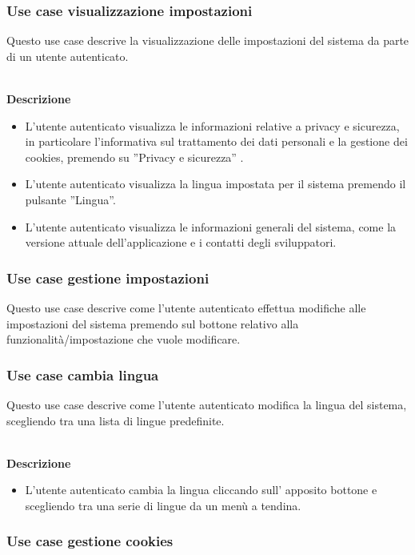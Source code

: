 \documentclass[a4paper,12pt]{article}
\begin{document}
\subsubsection*{Use case visualizzazione impostazioni}

Questo use case descrive la visualizzazione delle impostazioni del sistema da parte di un utente autenticato.

\textbf{\\Descrizione}
\begin{itemize} \setlength\itemsep{0.01em}
\item L'utente autenticato visualizza le informazioni relative a privacy e sicurezza, in particolare l'informativa sul trattamento dei dati personali e la gestione dei cookies, premendo su ''Privacy e sicurezza'' .
\item L'utente autenticato visualizza la lingua impostata per il sistema premendo il pulsante ''Lingua''.
\item L'utente autenticato visualizza le informazioni generali del sistema, come la versione attuale dell'applicazione e i contatti degli sviluppatori.
\end{itemize}

\subsubsection*{Use case gestione impostazioni}

Questo use case descrive come l'utente autenticato effettua modifiche alle impostazioni del sistema premendo sul bottone relativo alla funzionalità/impostazione che vuole modificare.


\subsubsection*{Use case cambia lingua}

Questo use case descrive come l'utente autenticato modifica la lingua del sistema, scegliendo tra una lista di lingue predefinite.

\textbf{\\Descrizione}
\begin{itemize} \setlength\itemsep{0.01em}
\item L'utente autenticato cambia la lingua cliccando sull' apposito bottone e scegliendo tra una serie di lingue da un menù a tendina.
\end{itemize}

\subsubsection*{Use case gestione cookies}
\end{document}
